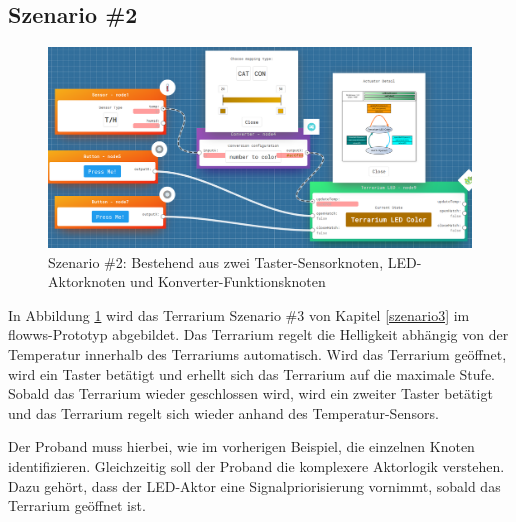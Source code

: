 \subsection{Szenario \#2}\label{anhang:szenario2}
\begin{figure}[H]
    \centering
    \includegraphics[width=1\textwidth]{bilder/Anhang/terrariumszenario_cut.png}
    \caption{Szenario \#2: Bestehend aus zwei Taster-Sensorknoten, LED-Aktorknoten und Konverter-Funktionsknoten}
    \label{fig:szenario3}
\end{figure}
In Abbildung \ref{fig:szenario3} wird das Terrarium Szenario \#3 von Kapitel \ref{szenario3} im flowws-Prototyp abgebildet. Das Terrarium regelt die Helligkeit abhängig von der Temperatur innerhalb des Terrariums automatisch.
Wird das Terrarium geöffnet, wird ein Taster betätigt und erhellt sich das Terrarium auf die maximale Stufe. Sobald das Terrarium wieder geschlossen wird, wird ein zweiter Taster betätigt und das Terrarium regelt sich wieder anhand des Temperatur-Sensors. 

Der Proband muss hierbei, wie im vorherigen Beispiel, die einzelnen Knoten identifizieren. Gleichzeitig soll der Proband die komplexere Aktorlogik verstehen. Dazu gehört, dass der LED-Aktor eine Signalpriorisierung vornimmt, sobald das Terrarium geöffnet ist.
\newpage